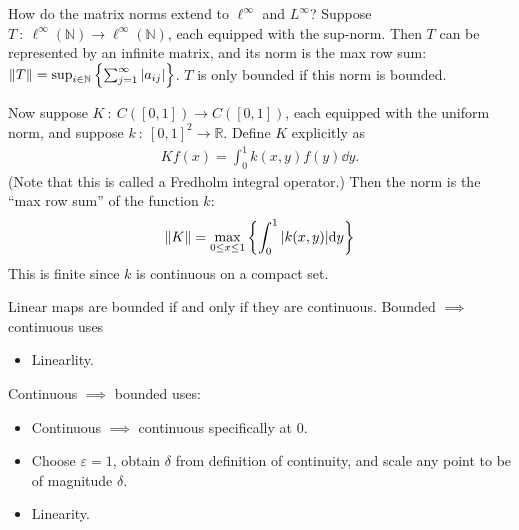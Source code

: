 \documentclass[avery5388,grid,frame]{flashcards}
\newcommand{\E}{\varepsilon}
\def\Rl{\mathbb{R}}
\begin{document}
\begin{flashcard}
    {How do the matrix norms extend to $\ell^\infty$ and $L^\infty$?}
    Suppose $T\ :\ \ell^\infty(\mathbb{N}) \rightarrow \ell^\infty(\mathbb{N})$, each equipped with the sup-norm.  Then $T$ can be represented by an infinite matrix, and its norm is the max row sum: $\norm{T} = \sup_{i\in\mathbb{N}}\left\{\sum_{j=1}^\infty \abs{a_{ij}}\right\}$.  $T$ is only bounded if this norm is bounded.

    Now suppose $K\ :\ C([0,1]) \rightarrow C([0,1])$, each equipped with the uniform norm, and suppose $k\ :\ [0,1]^2 \rightarrow \Rl$.  Define $K$ explicitly as
    \begin{align*}
        Kf(x) = \int_0^1 k(x,y)f(y)\dd y.
    \end{align*}
    (Note that this is called a Fredholm integral operator.)  Then the norm is the ``max row sum'' of the function $k$:
    \begin{align*}
        \norm{K} = \max_{0\leq x \leq 1} \left\{\int_0^1 \abs{k(x,y)}\dd y\right\}
    \end{align*}
    This is finite since $k$ is continuous on a compact set.
\end{flashcard}

\begin{flashcard}
    {Linear maps are bounded if and only if they are continuous.}
    Bounded $\implies$ continuous uses
    \begin{itemize}
        \item Linearlity.
    \end{itemize}
    Continuous $\implies$ bounded uses:
    \begin{itemize}
        \item Continuous $\implies$ continuous specifically at $0$.
        \item Choose $\E = 1$, obtain $\delta$ from definition of continuity, and scale any point to be of magnitude $\delta$.
        \item Linearity.
    \end{itemize}
\end{flashcard}
\end{document}
